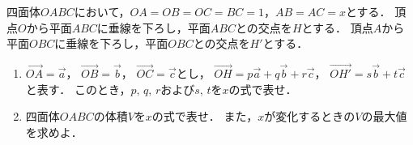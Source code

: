 \documentclass[../../main.tex]{subfiles}
\begin{document}
四面体$OABC$において，$OA=OB=OC=BC=1$，$AB=AC=x$とする．
頂点$O$から平面$ABC$に垂線を下ろし，平面$ABC$との交点を$H$とする．
頂点$A$から平面$OBC$に垂線を下ろし，平面$OBC$との交点を$H'$とする．
\begin{enumerate}
  \item $\overrightarrow{OA}=\overrightarrow{a}$，
    $\overrightarrow{OB}=\overrightarrow{b}$，
    $\overrightarrow{OC}=\overrightarrow{c}$とし，
    $\overrightarrow{OH}=p\overrightarrow{a}+q\overrightarrow{b}+r\overrightarrow{c}$，
    $\overrightarrow{OH'}=s\overrightarrow{b}+t\overrightarrow{c}$と表す．
    このとき，$p, \, q, \, r$および$s, \, t$を$x$の式で表せ．
  \item 四面体$OABC$の体積$V$を$x$の式で表せ．
    また，$x$が変化するときの$V$の最大値を求めよ．
\end{enumerate}
\end{document}
